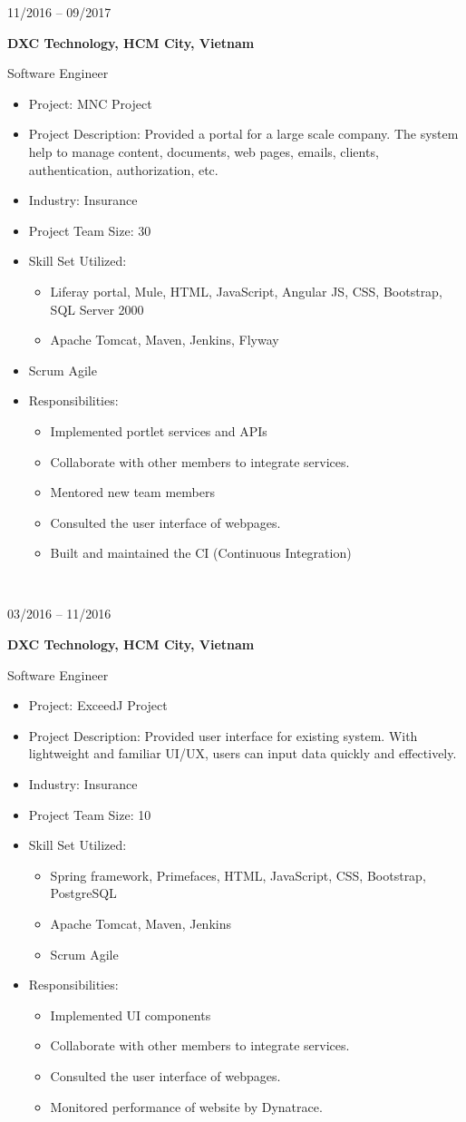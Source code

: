 \documentclass[10pt, letterpapaer]{article}
\newcommand{\bigentry}[3]{
\begin{minipage}[t]{.20\linewidth}
\hfill \textsc{#1}
\end{minipage}
\hfill\vline\hfill
\begin{minipage}[t]{.75\linewidth}
{\bf#2}\\{#3}
\end{minipage}\\
\vspace{.2cm}
}
\begin{document}
\bigentry{11/2016 – 09/2017}
{DXC Technology, HCM City, Vietnam}
{Software Engineer
\begin{itemize}
  \item Project: MNC Project
  \item Project Description: Provided a portal for a large scale company. The system help to manage content, documents, web pages,  emails, clients, authentication, authorization, etc. 
  \item Industry: Insurance
  \item Project Team Size: 30
  \item Skill Set Utilized:
	\begin{itemize}
	  \item Liferay portal, Mule, HTML, JavaScript, Angular JS, CSS, Bootstrap, SQL Server 2000
	  \item Apache Tomcat, Maven, Jenkins, Flyway
	\end{itemize}
  \item Scrum Agile
  \item Responsibilities:
	\begin{itemize}
	  \item Implemented portlet services and APIs
	  \item Collaborate with other members to integrate services.
	  \item Mentored new team members
	  \item Consulted the user interface of webpages. 
	  \item Built and maintained the CI (Continuous Integration)
	\end{itemize}
\end{itemize}}

\bigentry{03/2016 – 11/2016}
{DXC Technology, HCM City, Vietnam}
{Software Engineer
\begin{itemize}
  \item Project: ExceedJ Project
  \item Project Description: Provided user interface for existing system. With lightweight and familiar UI/UX, users can input data quickly and effectively.
  \item Industry: Insurance
  \item Project Team Size: 10
  \item Skill Set Utilized:
	\begin{itemize}
	  \item Spring framework, Primefaces, HTML, JavaScript, CSS, Bootstrap, PostgreSQL
	  \item Apache Tomcat, Maven, Jenkins
	  \item Scrum Agile
	\end{itemize}
  \item Responsibilities:
	\begin{itemize}
	  \item Implemented UI components
	  \item Collaborate with other members to integrate services.
	  \item Consulted the user interface of webpages. 
	  \item Monitored performance of website by Dynatrace.
	\end{itemize}
\end{itemize}}
\end{document}
